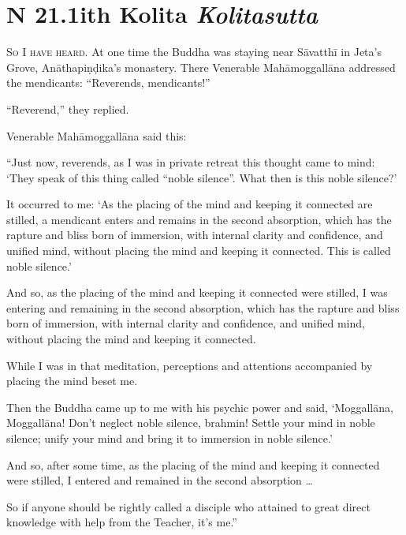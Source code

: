 \documentclass[12pt,openany]{book}%
\newcommand*{\suttatitleacronym}[1]{\smaller[2]{#1}\vspace*{.3em}}
\newcommand*{\suttatitletranslation}[1]{\linebreak{#1}}
\newcommand*{\suttatitleroot}[1]{\linebreak\smaller[2]\itshape{#1}}
\newcommand*{\tocacronym}[1]{\hspace*{-3.3em}{#1}\quad}
\newcommand*{\toctranslation}[1]{#1}
\newcommand*{\tocroot}[1]{(\textit{#1})}
\newcommand*{\scevam}[1]{\textsc{#1}}
\begin{document}
%
\section*{{\suttatitleacronym SN 21.1}{\suttatitletranslation With Kolita }{\suttatitleroot Kolitasutta}}
\addcontentsline{toc}{section}{\tocacronym{SN 21.1} \toctranslation{With Kolita } \tocroot{Kolitasutta}}

\scevam{So I have heard. }At one time the Buddha was staying near \textsanskrit{Sāvatthī} in Jeta’s Grove, \textsanskrit{Anāthapiṇḍika}’s monastery. There Venerable \textsanskrit{Mahāmoggallāna} addressed the mendicants: “Reverends, mendicants!” 

“Reverend,” they replied. 

Venerable \textsanskrit{Mahāmoggallāna} said this: 

“Just now, reverends, as I was in private retreat this thought came to mind: ‘They speak of this thing called “noble silence”. What then is this noble silence?’ 

It occurred to me: ‘As the placing of the mind and keeping it connected are stilled, a mendicant enters and remains in the second absorption, which has the rapture and bliss born of immersion, with internal clarity and confidence, and unified mind, without placing the mind and keeping it connected. This is called noble silence.’ 

And so, as the placing of the mind and keeping it connected were stilled, I was entering and remaining in the second absorption, which has the rapture and bliss born of immersion, with internal clarity and confidence, and unified mind, without placing the mind and keeping it connected. 

While I was in that meditation, perceptions and attentions accompanied by placing the mind beset me. 

Then the Buddha came up to me with his psychic power and said, ‘\textsanskrit{Moggallāna}, \textsanskrit{Moggallāna}! Don’t neglect noble silence, brahmin! Settle your mind in noble silence; unify your mind and bring it to immersion in noble silence.’ 

And so, after some time, as the placing of the mind and keeping it connected were stilled, I entered and remained in the second absorption … 

So if anyone should be rightly called a disciple who attained to great direct knowledge with help from the Teacher, it’s me.” 
\end{document}

